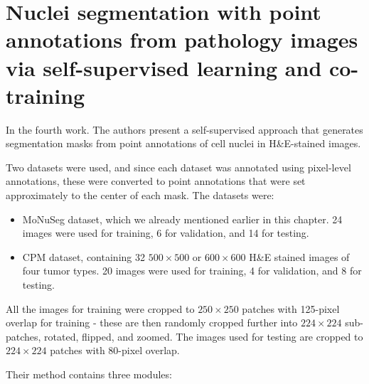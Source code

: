 \section{Nuclei segmentation with point annotations from pathology images via self-supervised learning and co-training \cite{Lin2023}}
\label{section:related-4}

In the fourth work. The authors present a self-supervised approach that generates segmentation masks from point annotations of cell nuclei in H\&E-stained images.

Two datasets were used, and since each dataset was annotated using pixel-level annotations, these were converted to point annotations that were set approximately to the center of each mask. The datasets were:

\begin{itemize}
    \item MoNuSeg dataset, which we already mentioned earlier in this chapter. 24 images were used for training, 6 for validation, and 14 for testing.
    \item CPM dataset, containing 32 $500\!\times\!500$ or $600\!\times\!600$ H\&E stained images of four tumor types. 20 images were used for training, 4 for validation, and 8 for testing.
\end{itemize}

All the images for training were cropped to $250\!\times\!250$ patches with 125-pixel overlap for training - these are then randomly cropped further into $224\!\times\!224$ sub-patches, rotated, flipped, and zoomed. The images used for testing are cropped to $224\!\times\!224$ patches with 80-pixel overlap.

Their method contains three modules:

